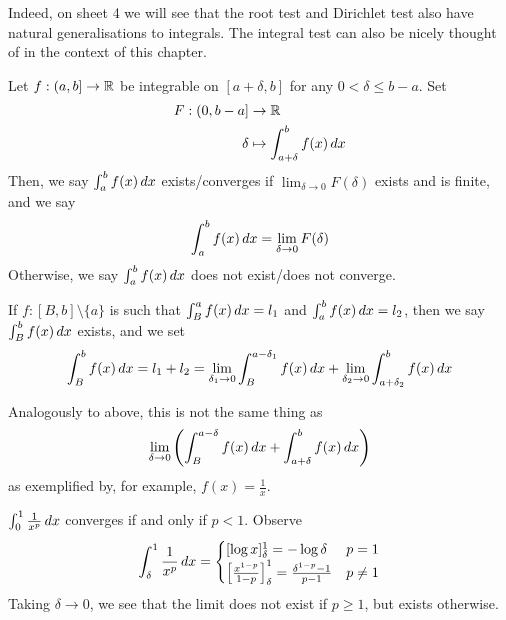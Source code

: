 \documentclass{../../template/note}
\begin{document}
    Indeed, on sheet 4 we will see that the root test and Dirichlet test also have natural generalisations to integrals. The integral test can also be nicely thought of in the context of this chapter.


    \begin{definition}
        Let \(f: (a, b] \to \mathbb R\) be integrable on \([a + \delta, b]\) for any \(0 < \delta \leq b-a\). Set 
        \begin{align*}
            F: (0, b-a] &\to \mathbb R \\
            \delta &\mapsto \int_{a+\delta}^b f(x) \,d{x}
        \end{align*}
        Then, we say \(\int_a^b f(x) \,d{x}\) exists/converges if \(\lim_{\delta \to 0} F(\delta)\) exists and is finite, and we say
        \begin{align*}
            \int_a^b f(x) \,d{x} = \lim_{\delta \to 0} F(\delta)
        \end{align*}
        Otherwise, we say \(\int_a^b f(x) \,d{x}\) does not exist/does not converge.

        If \(f: [B, b] \setminus \{a\}\) is such that \(\int_B^a f(x) \,d{x} = l_1\) and \(\int_a^b f(x) \,d{x} = l_2\), then we say \(\int_B^b f(x) \,d{x}\) exists, and we set
        \begin{align*}
            \int_B^b f(x) \,d{x} = l_1 + l_2 = \lim_{\delta_1 \to 0} \int_B^{a-\delta_1} f(x) \,d{x} + \lim_{\delta_2 \to 0} \int_{a+\delta_2}^b f(x) \,d{x}
        \end{align*}
    \end{definition}
    
    \begin{remark*}
        Analogously to above, this is not the same thing as
        \begin{align*}
            \lim_{\delta \to 0} \left(\int_B^{a-\delta} f(x) \,d{x} + \int_{a+\delta}^b f(x) \,d{x}\right)
        \end{align*}
        as exemplified by, for example, \(f(x) = \frac 1 x\).
    \end{remark*}
    
    \begin{example*}
        \(\int_0^1 \frac 1 {x^p} \,d{x}\) converges if and only if \(p < 1\). Observe
        \begin{align*}
            \int_\delta^1 \frac 1 {x^p} \,d{x} = \begin{cases}
                [\log x]_{\delta}^1 = -\log \delta & p = 1 \\
                \left[\frac{x^{1-p}}{1-p}\right]_\delta^1 = \frac{\delta^{1-p}-1}{p-1} & p \neq 1
            \end{cases}
        \end{align*}
        Taking \(\delta \to 0\), we see that the limit does not exist if \(p \geq 1\), but exists otherwise.
    \end{example*}
    
\end{document}

